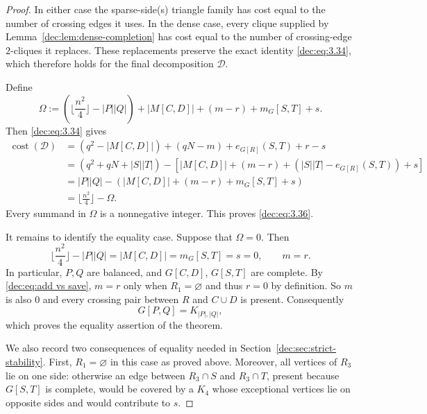 \documentclass[11pt]{article}
\numberwithin{equation}{section}
\theoremstyle{remark}
\DeclareMathOperator{\cost}{cost}
\begin{document}
\begin{proof}
In either case the sparse-side(s) triangle family has cost equal to the number of
crossing edges it uses.  In the dense case, every clique supplied by
Lemma~\ref{dec:lem:dense-completion} has cost equal to the number of crossing-edge
\(2\)-cliques it replaces.  These replacements preserve
the exact identity \eqref{dec:eq:3.34}, which therefore holds for the final decomposition \(\mathcal D\).

Define
\begin{equation*}
\Omega:=(\lfloor \frac{n^2}{4}\rfloor-|P||Q|)+|M[C,D]|+(m-r)+m_G[S,T]+s.
\end{equation*}
Then \eqref{dec:eq:3.34} gives
\begin{equation*}
\begin{split}
 \cost(\mathcal D)
 &=(q^2-|M[C,D]|)+(qN-m)+e_{G[R]}(S,T)+r-s\\
 &=(q^2+qN+|S||T|)-\left[|M[C,D]|+(m-r)+\left(|S||T|-e_{G[R]}(S,T)\right)+s\right]\\
 &=|P||Q|-\left(|M[C,D]|+(m-r)+m_G[S,T]+s\right)\\
 &=\lfloor \frac{n^2}{4}\rfloor-\Omega.
\end{split}
\end{equation*}
Every summand in \(\Omega\) is a nonnegative integer. This proves \eqref{dec:eq:3.36}.

It remains to identify the equality case. Suppose that \(\Omega=0\). Then
\begin{equation*}
 \lfloor \frac{n^2}{4}\rfloor-|P||Q|=|M[C,D]|=m_G[S,T]=s=0,\qquad m=r.
\end{equation*}
In particular, \(P,Q\) are balanced, and \(G[C,D]\), \(G[S,T]\) are complete. By \eqref{dec:eq:add vs save},
\(m=r\) only when \(R_1=\varnothing\) and thus \(r=0\) by definition.
So \(m\) is also \(0\) and every crossing pair between \(R\) and \(C\cup D\) is present. Consequently
\begin{equation*}
 G[P,Q]=K_{|P|,|Q|},
\end{equation*}
which proves the equality assertion of the theorem.

We also record two consequences of equality needed in Section~\ref{dec:sec:strict-stability}.
First, \(R_1=\varnothing\) in this case as proved above. Moreover, all vertices of \(R_3\) lie on one side:
otherwise an edge between \(R_3\cap S\) and \(R_3\cap T\), present because \(G[S,T]\) is complete,
would be covered by a \(K_4\) whose exceptional vertices lie on opposite sides and would contribute to \(s\).
\end{proof}
\end{document}
